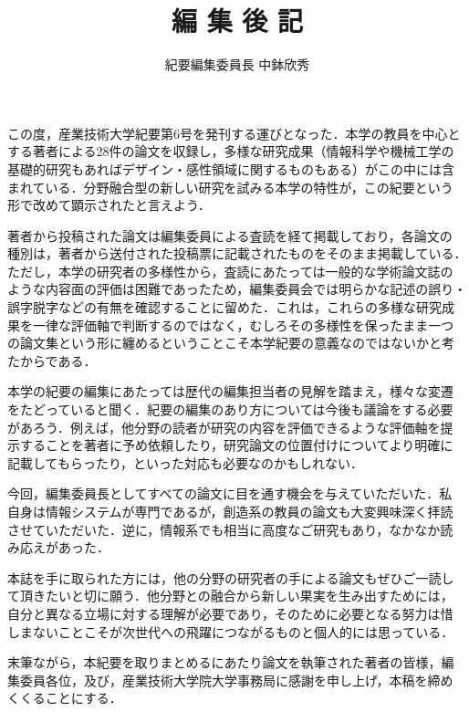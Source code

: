 \documentclass[a4j,twoside]{jarticle}
\title{編 集 後 記}
\author{紀要編集委員長 中鉢欣秀}
\date{}
\begin{document}
\pagestyle{empty}
\maketitle

この度，産業技術大学紀要第6号を発刊する運びとなった．本学の教員を中心と
する著者による28件の論文を収録し，多様な研究成果（情報科学や機械工学の
基礎的研究もあればデザイン・感性領域に関するものもある）がこの中には含
まれている．分野融合型の新しい研究を試みる本学の特性が，この紀要という
形で改めて顕示されたと言えよう．

著者から投稿された論文は編集委員による査読を経て掲載しており，各論文の
種別は，著者から送付された投稿票に記載されたものをそのまま掲載している．
ただし，本学の研究者の多様性から，査読にあたっては一般的な学術論文誌の
ような内容面の評価は困難であったため，編集委員会では明らかな記述の誤り・
誤字脱字などの有無を確認することに留めた．これは，これらの多様な研究成
果を一律な評価軸で判断するのではなく，むしろその多様性を保ったまま一つ
の論文集という形に纏めるということこそ本学紀要の意義なのではないかと考
たからである．

本学の紀要の編集にあたっては歴代の編集担当者の見解を踏まえ，様々な変遷
をたどっていると聞く．紀要の編集のあり方については今後も議論をする必要
があろう．例えば，他分野の読者が研究の内容を評価できるような評価軸を提
示することを著者に予め依頼したり，研究論文の位置付けについてより明確に
記載してもらったり，といった対応も必要なのかもしれない．

今回，編集委員長としてすべての論文に目を通す機会を与えていただいた．私
自身は情報システムが専門であるが，創造系の教員の論文も大変興味深く拝読
させていただいた．逆に，情報系でも相当に高度なご研究もあり，なかなか読
み応えがあった．

本誌を手に取られた方には，他の分野の研究者の手による論文もぜひご一読し
て頂きたいと切に願う．他分野との融合から新しい果実を生み出すためには，
自分と異なる立場に対する理解が必要であり，そのために必要となる努力は惜
しまないことこそが次世代への飛躍につながるものと個人的には思っている．

末筆ながら，本紀要を取りまとめるにあたり論文を執筆された著者の皆様，編
集委員各位，及び，産業技術大学院大学事務局に感謝を申し上げ，本稿を締め
くくることにする．
\end{document}
